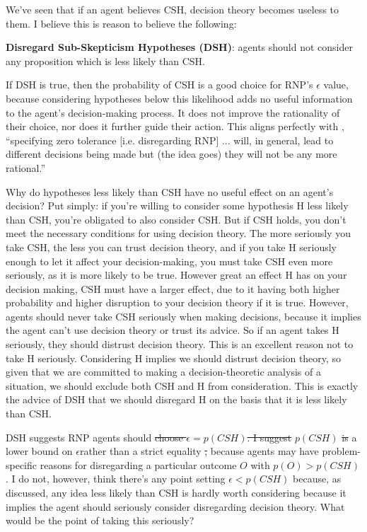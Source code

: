 \documentclass{article}
\providecommand{\DIFadd}[1]{{\protect\color{blue}\uwave{#1}}} %
\providecommand{\DIFdel}[1]{{\protect\color{red}\sout{#1}}}                      %
\providecommand{\DIFaddbegin}{} %
\providecommand{\DIFaddend}{} %
\providecommand{\DIFdelbegin}{} %
\providecommand{\DIFdelend}{} %
\begin{document}
\DIFdelend We've seen that if an agent believes CSH, decision theory becomes useless to them. I believe this is reason to believe the following:

\textbf{Disregard Sub-Skepticism Hypotheses (DSH)}: agents should not consider any proposition which is less likely than CSH.

If DSH is true, then the probability of CSH is a good choice for RNP's \(\epsilon\) value, because considering hypotheses below this likelihood adds no useful information to the agent's decision-making process. It does not improve the rationality of their choice, nor does it further guide their action. This aligns perfectly with \citep[pg. 475]{smith2014evaluative}, ``specifying zero tolerance [i.e. disregarding RNP] ... will, in general, lead to different decisions being made \textemdash{} but (the idea goes) they will not be any more rational.''

Why do hypotheses less likely than CSH have no useful effect on an agent's decision? Put simply: if you're willing to consider some hypothesis H less likely than CSH, you're obligated to also consider CSH. But if CSH holds, you don't meet the necessary conditions for using decision theory. The more seriously you take CSH, the less you can trust decision theory, and if you take H seriously enough to let it affect your decision-making, you must take CSH even more seriously, as it is more likely to be true. However great an effect H has on your decision making, CSH must have a larger effect, due to it having both higher probability and higher disruption to your decision theory if it is true. However, agents should never take CSH seriously when making decisions, because it implies the agent can't use decision theory or trust its advice. So if an agent takes H seriously, they should distrust decision theory. This is an excellent reason not to take H seriously. Considering H implies we should distrust decision theory, so given that we are committed to making a decision-theoretic analysis of a situation, we should exclude both CSH and H from consideration. This is exactly the advice of DSH \textemdash{} that we should disregard H on the basis that it is less likely than CSH. 

DSH suggests RNP agents should \DIFdelbegin \DIFdel{choose \(\epsilon=p(CSH)\). I suggest }\DIFdelend \DIFaddbegin \DIFadd{use }\DIFaddend \(p(CSH)\) \DIFdelbegin \DIFdel{is }\DIFdelend \DIFaddbegin \DIFadd{as }\DIFaddend a lower bound on \(\epsilon\)\DIFaddbegin \DIFadd{. I propose a lower bound }\DIFaddend rather than a strict equality \DIFdelbegin \DIFdel{, }\DIFdelend because agents may have problem-specific reasons for disregarding a particular outcome \(O\) with \(p(O)>p(CSH)\). I do not, however, think there's any point setting \(\epsilon < p(CSH)\) because, as discussed, any idea less likely than CSH is hardly worth considering because it implies the agent should seriously consider disregarding decision theory. What would be the point of taking this seriously?
\end{document}
